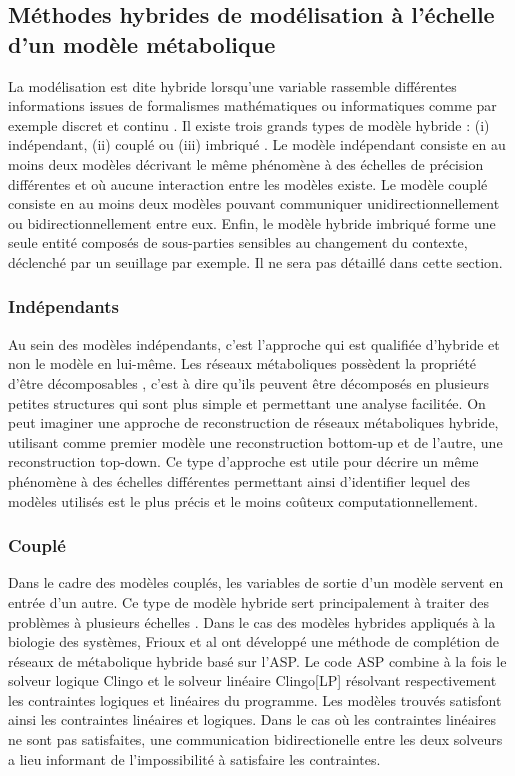 \documentclass[../main.tex]{subfiles}
\begin{document}
\subsection{Méthodes hybrides de modélisation à l'échelle d'un modèle métabolique}

La modélisation est dite hybride lorsqu'une variable rassemble différentes informations issues de formalismes mathématiques ou informatiques comme par exemple discret et continu \citep{Cruz2022}. Il existe trois grands types de modèle hybride : (i) indépendant, (ii) couplé ou (iii) imbriqué \citep{Stephanou2016}. Le modèle indépendant consiste en au moins deux modèles décrivant le même phénomène à des échelles de précision différentes et où aucune interaction entre les modèles existe. Le modèle couplé  consiste en au moins deux modèles pouvant communiquer unidirectionnellement ou bidirectionnellement entre eux. Enfin, le modèle hybride imbriqué forme une seule entité composés de sous-parties sensibles au changement du contexte, déclenché par un seuillage par exemple. Il ne sera pas détaillé dans cette section. \\
 
\subsubsection{Indépendants}
Au sein des modèles indépendants, c'est l'approche qui est qualifiée d'hybride et non le modèle en lui-même. Les réseaux métaboliques possèdent la propriété d'être décomposables \citep{Fisher2010}, c'est à dire qu'ils peuvent être décomposés en plusieurs petites structures qui sont plus simple et permettant une analyse facilitée. On peut imaginer une approche de reconstruction de réseaux métaboliques hybride, utilisant comme premier modèle une reconstruction bottom-up et de l'autre, une reconstruction top-down. Ce type d'approche est utile pour décrire un même phénomène à des échelles différentes permettant ainsi d'identifier lequel des modèles utilisés est le plus précis et le moins coûteux computationnellement. \\

\subsubsection{Couplé}
Dans le cadre des modèles couplés, les variables de sortie d'un modèle servent en entrée d'un autre. Ce type de modèle hybride sert principalement à traiter des problèmes à plusieurs échelles \citep{Brook2008}. Dans le cas des modèles hybrides appliqués à la biologie des systèmes, Frioux et al \citep{Frioux2019} ont développé une méthode de complétion de réseaux de métabolique hybride basé sur l'ASP. Le code ASP combine à la fois le solveur logique Clingo \citep{Gebser2019} et le solveur linéaire Clingo[LP] \citep{Janhunen2017} résolvant respectivement les contraintes logiques et linéaires du programme. Les modèles trouvés satisfont ainsi les contraintes linéaires et logiques. Dans le cas où les contraintes linéaires ne sont pas satisfaites, une communication bidirectionelle entre les deux solveurs a lieu informant de l'impossibilité à satisfaire les contraintes.\\
\end{document}
